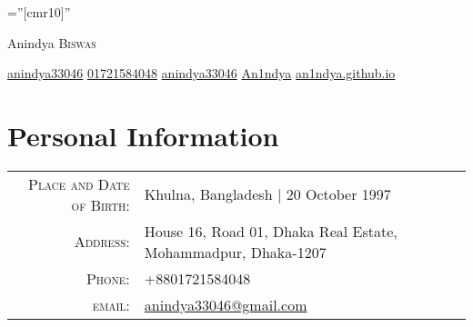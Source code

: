 \documentclass[a4paper,10pt]{article}
\begin{document}

\pagestyle{empty} %

\font\fb=''[cmr10]'' %

\par{\centering
		{\Huge Anindya \textsc{Biswas}
	}\bigskip\par}
    

\begingroup
 \hypersetup{hidelinks}
 \href{mailto:anindya33046@email.com}{ anindya33046} \hspace{1ex}
\href{tel:+8801721584048}{ 01721584048} \hspace{1ex}
\href{https://linkedin.com/in/anindya33046/}{ anindya33046} \hspace{1ex}
\href{https://github.com/An1ndya}{ An1ndya} \hspace{1ex}
\href{ https://an1ndya.github.io/}{an1ndya.github.io}
\endgroup   
\vspace{1em}
\section{Personal Information}

\begin{tabular}{rl}
    \textsc{Place and Date of Birth:} & Khulna, Bangladesh  | 20 October 1997 \\
    \textsc{Address:}   & House 16, Road 01, Dhaka Real Estate, Mohammadpur, Dhaka-1207 \\
    \textsc{Phone:}     & +8801721584048\\
    \textsc{email:}     &  \href{mailto:anindya33046@email.com}{anindya33046@gmail.com}
\end{tabular}

\end{document}
